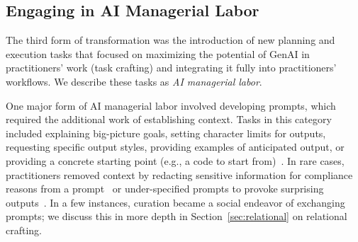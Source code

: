
\subsection{Engaging in AI Managerial Labor}
\label{sec:aimanagerial}
The third form of transformation was the introduction of new planning and execution tasks that focused on maximizing the potential of GenAI in practitioners' work (task crafting) and integrating it fully into practitioners' workflows. We describe these tasks as \textit{AI managerial labor}.

One major form of AI managerial labor involved developing prompts, which required the additional work of establishing context. Tasks in this category included explaining big-picture goals, setting character limits for outputs, requesting specific output styles, providing examples of anticipated output, or providing a concrete starting point (e.g., a code to start from)~\cite{4,6,16}. In rare cases, practitioners removed context by redacting sensitive information for compliance reasons from a prompt~\cite{18} or under-specified prompts to provoke surprising outputs~\cite{9}.
In a few instances, curation became a social endeavor of exchanging prompts; we discuss this in more depth in Section~\ref{sec:relational} on relational crafting. 



